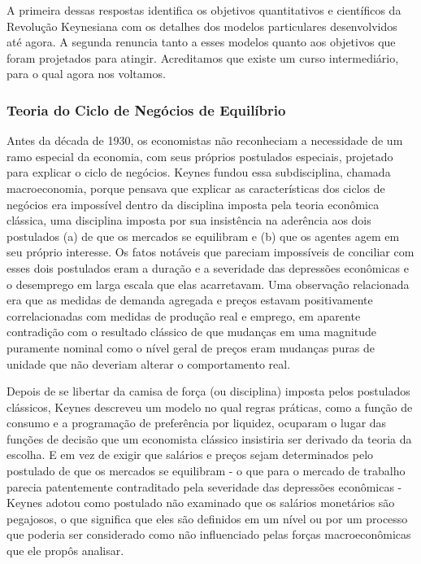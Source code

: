 \documentclass[a4paper,12pt]{article}[abntex2]
\begin{document}
A primeira dessas respostas identifica os objetivos quantitativos e científicos da Revolução Keynesiana com os detalhes dos modelos particulares desenvolvidos até agora. A segunda renuncia tanto a esses modelos quanto aos objetivos que foram projetados para atingir. Acreditamos que existe um curso intermediário, para o qual agora nos voltamos.

\subsubsection{\textbf{Teoria do Ciclo de Negócios de Equilíbrio}}

Antes da década de 1930, os economistas não reconheciam a necessidade de um ramo especial da economia, com seus próprios postulados especiais, projetado para explicar o ciclo de negócios. Keynes fundou essa subdisciplina, chamada macroeconomia, porque pensava que explicar as características dos ciclos de negócios era impossível dentro da disciplina imposta pela teoria econômica clássica, uma disciplina imposta por sua insistência na aderência aos dois postulados (a) de que os mercados se equilibram e (b) que os agentes agem em seu próprio interesse. Os fatos notáveis que pareciam impossíveis de conciliar com esses dois postulados eram a duração e a severidade das depressões econômicas e o desemprego em larga escala que elas acarretavam. Uma observação relacionada era que as medidas de demanda agregada e preços estavam positivamente correlacionadas com medidas de produção real e emprego, em aparente contradição com o resultado clássico de que mudanças em uma magnitude puramente nominal como o nível geral de preços eram mudanças puras de unidade que não deveriam alterar o comportamento real.

Depois de se libertar da camisa de força (ou disciplina) imposta pelos postulados clássicos, Keynes descreveu um modelo no qual regras práticas, como a função de consumo e a programação de preferência por liquidez, ocuparam o lugar das funções de decisão que um economista clássico insistiria ser derivado da teoria da escolha. E em vez de exigir que salários e preços sejam determinados pelo postulado de que os mercados se equilibram - o que para o mercado de trabalho parecia patentemente contraditado pela severidade das depressões econômicas - Keynes adotou como postulado não examinado que os salários monetários são pegajosos, o que significa que eles são definidos em um nível ou por um processo que poderia ser considerado como não influenciado pelas forças macroeconômicas que ele propôs analisar.
\end{document}
